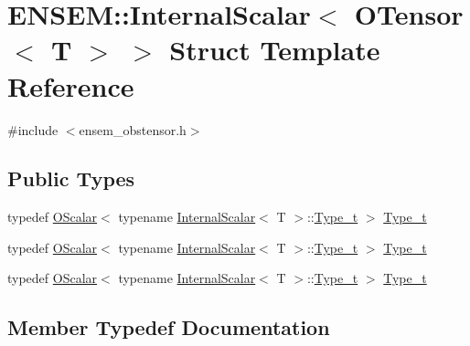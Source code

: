 \hypertarget{structENSEM_1_1InternalScalar_3_01OTensor_3_01T_01_4_01_4}{}\section{E\+N\+S\+EM\+:\+:Internal\+Scalar$<$ O\+Tensor$<$ T $>$ $>$ Struct Template Reference}
\label{structENSEM_1_1InternalScalar_3_01OTensor_3_01T_01_4_01_4}


{\ttfamily \#include $<$ensem\+\_\+obstensor.\+h$>$}

\subsection*{Public Types}
\begin{DoxyCompactItemize}
\item 
typedef \mbox{\hyperlink{classENSEM_1_1OScalar}{O\+Scalar}}$<$ typename \mbox{\hyperlink{structENSEM_1_1InternalScalar}{Internal\+Scalar}}$<$ T $>$\+::\mbox{\hyperlink{structENSEM_1_1InternalScalar_3_01OTensor_3_01T_01_4_01_4_a3f6b2482642650ffa201bbe320aaa7aa}{Type\+\_\+t}} $>$ \mbox{\hyperlink{structENSEM_1_1InternalScalar_3_01OTensor_3_01T_01_4_01_4_a3f6b2482642650ffa201bbe320aaa7aa}{Type\+\_\+t}}
\item 
typedef \mbox{\hyperlink{classENSEM_1_1OScalar}{O\+Scalar}}$<$ typename \mbox{\hyperlink{structENSEM_1_1InternalScalar}{Internal\+Scalar}}$<$ T $>$\+::\mbox{\hyperlink{structENSEM_1_1InternalScalar_3_01OTensor_3_01T_01_4_01_4_a3f6b2482642650ffa201bbe320aaa7aa}{Type\+\_\+t}} $>$ \mbox{\hyperlink{structENSEM_1_1InternalScalar_3_01OTensor_3_01T_01_4_01_4_a3f6b2482642650ffa201bbe320aaa7aa}{Type\+\_\+t}}
\item 
typedef \mbox{\hyperlink{classENSEM_1_1OScalar}{O\+Scalar}}$<$ typename \mbox{\hyperlink{structENSEM_1_1InternalScalar}{Internal\+Scalar}}$<$ T $>$\+::\mbox{\hyperlink{structENSEM_1_1InternalScalar_3_01OTensor_3_01T_01_4_01_4_a3f6b2482642650ffa201bbe320aaa7aa}{Type\+\_\+t}} $>$ \mbox{\hyperlink{structENSEM_1_1InternalScalar_3_01OTensor_3_01T_01_4_01_4_a3f6b2482642650ffa201bbe320aaa7aa}{Type\+\_\+t}}
\end{DoxyCompactItemize}


\subsection{Member Typedef Documentation}
\mbox{\label{structENSEM_1_1InternalScalar_3_01OTensor_3_01T_01_4_01_4_a3f6b2482642650ffa201bbe320aaa7aa}} 
